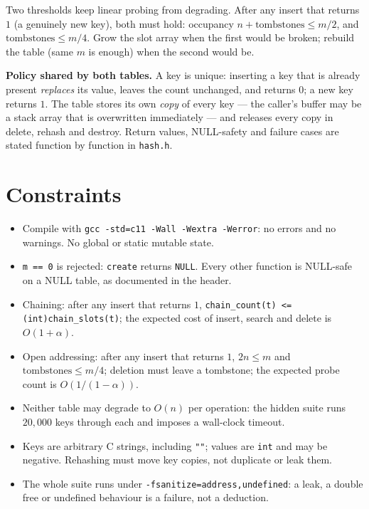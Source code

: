 \documentclass[11pt]{article}
\begin{document}
Two thresholds keep linear probing from degrading. After any insert that returns $1$ (a genuinely new key), both must hold: occupancy $n + \text{tombstones} \le m/2$, and $\text{tombstones} \le m/4$. Grow the slot array when the first would be broken; rebuild the table (same $m$ is enough) when the second would be.

\textbf{Policy shared by both tables.} A key is unique: inserting a key that is already present \emph{replaces} its value, leaves the count unchanged, and returns $0$; a new key returns $1$. The table stores its own \emph{copy} of every key --- the caller's buffer may be a stack array that is overwritten immediately --- and releases every copy in delete, rehash and destroy. Return values, NULL-safety and failure cases are stated function by function in \texttt{hash.h}.

\section{Constraints}

\begin{itemize}
  \item Compile with \texttt{gcc -std=c11 -Wall -Wextra -Werror}: no errors and no warnings. No global or static mutable state.
  \item \texttt{m == 0} is rejected: \texttt{create} returns \texttt{NULL}. Every other function is NULL-safe on a NULL table, as documented in the header.
  \item Chaining: after any insert that returns $1$, \texttt{chain\_count(t) <= (int)chain\_slots(t)}; the expected cost of insert, search and delete is $O(1+\alpha)$.
  \item Open addressing: after any insert that returns $1$, $2n \le m$ and $\text{tombstones} \le m/4$; deletion must leave a tombstone; the expected probe count is $O(1/(1-\alpha))$.
  \item Neither table may degrade to $O(n)$ per operation: the hidden suite runs $20{,}000$ keys through each and imposes a wall-clock timeout.
  \item Keys are arbitrary C strings, including \texttt{""}; values are \texttt{int} and may be negative. Rehashing must move key copies, not duplicate or leak them.
  \item The whole suite runs under \texttt{-fsanitize=address,undefined}: a leak, a double free or undefined behaviour is a failure, not a deduction.
\end{itemize}
\end{document}
